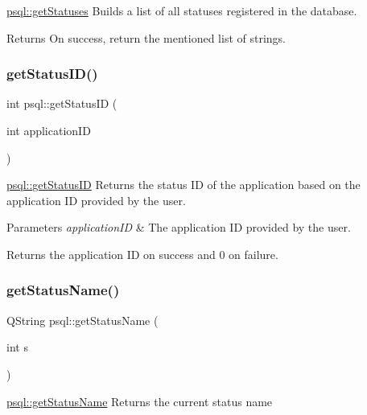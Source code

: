 \hyperlink{classpsql_a14854d28aabc7e658aea87a7b8b52e5c}{psql\+::get\+Statuses} Builds a list of all statuses registered in the database. 

\begin{DoxyReturn}{Returns}
On success, return the mentioned list of strings. 
\end{DoxyReturn}
\mbox{\label{classpsql_a9c02c92c09cb60c35d24375673b7df06}} 
\subsubsection{\texorpdfstring{get\+Status\+I\+D()}{getStatusID()}}
{\footnotesize\ttfamily int psql\+::get\+Status\+ID (\begin{DoxyParamCaption}\item[{int}]{application\+ID }\end{DoxyParamCaption})}



\hyperlink{classpsql_a9c02c92c09cb60c35d24375673b7df06}{psql\+::get\+Status\+ID} Returns the status ID of the application based on the application ID provided by the user. 


\begin{DoxyParams}{Parameters}
{\em application\+ID} & The application ID provided by the user. \\
\hline
\end{DoxyParams}
\begin{DoxyReturn}{Returns}
the application ID on success and 0 on failure. 
\end{DoxyReturn}
\mbox{\label{classpsql_a5c2a64419a68a258071fd1f9a37c7c09}} 
\subsubsection{\texorpdfstring{get\+Status\+Name()}{getStatusName()}}
{\footnotesize\ttfamily Q\+String psql\+::get\+Status\+Name (\begin{DoxyParamCaption}\item[{int}]{s }\end{DoxyParamCaption})}



\hyperlink{classpsql_a5c2a64419a68a258071fd1f9a37c7c09}{psql\+::get\+Status\+Name} Returns the current status name 


